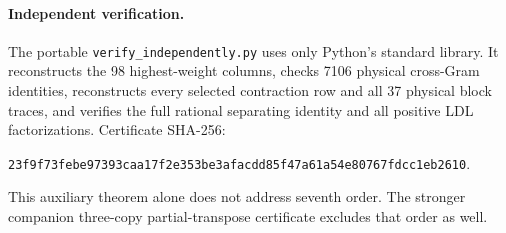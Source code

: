 \documentclass[11pt]{article}
\begin{document}
\paragraph{Independent verification.}
The portable \texttt{verify\_independently.py} uses only Python's standard library. It reconstructs the 98 highest-weight columns, checks 7106 physical cross-Gram identities, reconstructs every selected contraction row and all 37 physical block traces, and verifies the full rational separating identity and all positive LDL factorizations. Certificate SHA-256:
\begin{center}\small\texttt{23f9f73febe97393caa17f2e353be3afacdd85f47a61a54e80767fdcc1eb2610}.\end{center}
This auxiliary theorem alone does not address seventh order. The stronger companion three-copy partial-transpose certificate excludes that order as well.
\end{document}
